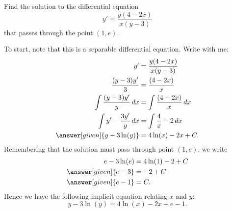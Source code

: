 \documentclass{ximera}
\begin{document}
\begin{example}
  Find the solution to the differential equation
  \[
  y' = \frac{y(4-2x)}{x(y-3)}
  \]
  that passes through the point $(1,e)$.
  \begin{explanation}
    To start, note that this is a separable differential equation. Write with me:
    \begin{align*}
      y' &= \frac{y(4-2x)}{x(y-3)}\\
      \frac{(y-3)y'}{3}&=\frac{(4-2x)}{x}\\
      \int \frac{(y-3)y'}{y}\d x&=\int \frac{(4-2x)}{x}\d x\\
      \int y'-\frac{3y'}{y}\d x&=\int \frac{4}{x}-2\d x\\
      \answer[given]{y-3\ln(y)} &=4\ln(x)-2x+C.
    \end{align*}
    Remembering that the solution must pass through point $(1,e)$, we write
    \begin{align*}
      e-3\ln(e) &=4\ln(1)-2+C\\
      \answer[given]{e-3} &=-2+C\\
      \answer[given]{e-1} &=C.
    \end{align*}
    Hence we have the following implicit equation relating $x$ and $y$:
    \[
    y-3\ln(y) =4\ln(x)-2x+e-1.
    \]
   \end{explanation}
\end{example}




\end{document}
